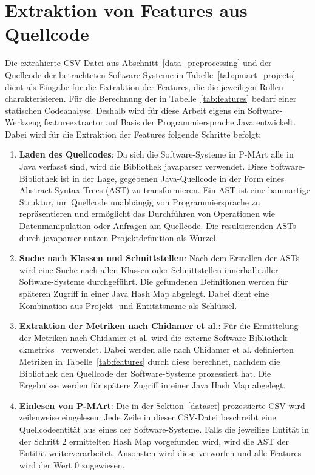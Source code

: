 \section{Extraktion von Features aus Quellcode}\label{feature_extraction}
Die extrahierte CSV-Datei aus Abschnitt~\ref{data_preprocessing} und der Quellcode der betrachteten Software-Systeme in Tabelle~\ref{tab:pmart_projects} dient als Eingabe für die Extraktion der Features,
die die jeweiligen Rollen charakterisieren. 
Für die Berechnung der in Tabelle~\ref{tab:features} bedarf einer statischen Codeanalyse. Deshalb wird für diese Arbeit eigens ein Software-Werkzeug featureextractor auf Basis der Programmiersprache Java entwickelt.
Dabei wird für die Extraktion der Features folgende Schritte befolgt:

\begin{enumerate}
    \item \textbf{Laden des Quellcodes}: Da sich die Software-Systeme in P-MArt alle in Java verfasst sind, wird die Bibliothek javaparser verwendet. Diese Software-Bibliothek ist in der Lage, gegebenen Java-Quellcode in der Form eines Abstract Syntax Trees (AST) zu transformieren.
    Ein AST ist eine baumartige Struktur, um Quellcode unabhängig von Programmiersprache zu repräsentieren und ermöglicht das Durchführen von Operationen wie Datenmanipulation oder Anfragen am Quellcode. Die resultierenden ASTs durch javaparser nutzen Projektdefinition als Wurzel. 
    \item \textbf{Suche nach Klassen und Schnittstellen}: Nach dem Erstellen der ASTs wird eine Suche nach allen Klassen oder Schnittstellen innerhalb aller Software-Systeme durchgeführt. Die gefundenen Definitionen werden für späteren Zugriff in einer Java Hash Map abgelegt.
    Dabei dient eine Kombination aus Projekt- und Entitätsname als Schlüssel. 
    \item \textbf{Extraktion der Metriken nach Chidamer et al.}: Für die Ermittelung der Metriken nach Chidamer et al. wird die externe Software-Bibliothek ckmetrics~\cite{aniche-ck} verwendet. Dabei werden alle nach Chidamer et al. definierten Metriken in Tabelle~\ref{tab:features} durch diese berechnet, nachdem die Bibliothek den Quellcode der Software-Systeme prozessiert hat. Die Ergebnisse werden für spätere Zugriff in einer Java Hash Map abgelegt.
    \item \textbf{Einlesen von P-MArt}: Die in der Sektion~\ref{dataset} prozessierte CSV wird zeilenweise eingelesen. Jede Zeile in dieser CSV-Datei beschreibt eine Quellcodeentität aus eines der Software-Systeme. Falls die jeweilige Entität in der Schritt 2 ermittelten Hash Map vorgefunden wird, wird die AST der Entität weiterverarbeitet. Ansonsten wird diese verworfen und alle Features wird der Wert 0 zugewiesen.

\end{enumerate}
